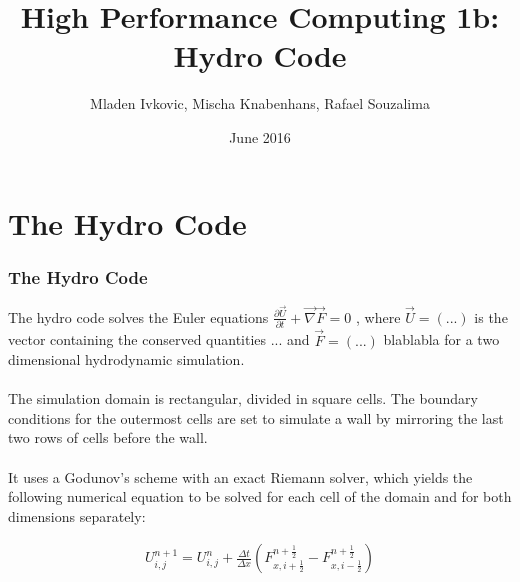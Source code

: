 \documentclass[8pt]{beamer}
\title{High Performance Computing 1b: Hydro Code}
\author{
	Mladen Ivkovic, Mischa Knabenhans, Rafael Souzalima
}
\date{June 2016}
\begin{document}
% 
% 
% 
% 
% 


\begin{frame}{}
	\titlepage
\end{frame}
\small

\section{The Hydro Code}
\begin{frame}
	\frametitle{The Hydro Code}
	
	The hydro code solves the Euler equations $\displaystyle \frac{\partial \vec{U}}{\partial t} + \vec{\nabla} \vec{F} = 0 $ , where $\vec{U} = (...) $ is the vector containing the conserved quantities ... and $\vec{F} = (...)$  blablabla for a two dimensional hydrodynamic simulation. \\~\\
	
	The simulation domain is rectangular, divided in square cells. The boundary conditions for the outermost cells are set to simulate a wall by mirroring the last two rows of cells before the wall. \\~\\
	
	It uses a Godunov's scheme with an exact Riemann solver, which yields the following numerical equation to be solved for each cell of the domain and for both dimensions separately:
	
	\begin{align*}
		U^{n+1}_{i,j} = U^n_{i,j} + \frac{\Delta t}{\Delta x} \left( F^{n + \frac{1}{2}}_{x, i + \frac{1}{2}} -  F^{n + \frac{1}{2}}_{x, i - \frac{1}{2}}\right)
	\end{align*}
\end{frame}
\end{document}
